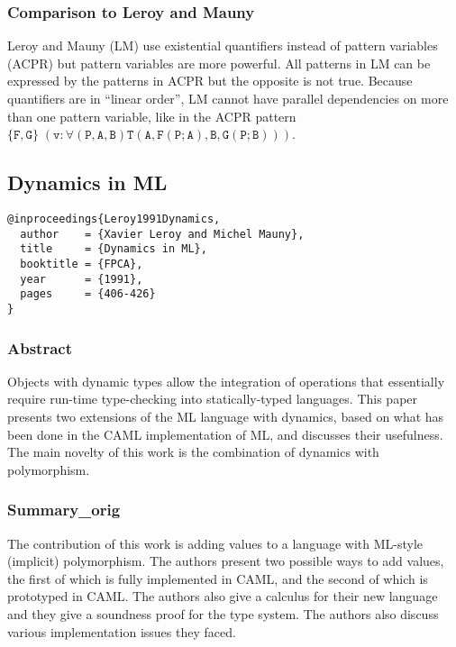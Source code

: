 \documentclass[12pt]{article}	%
\begin{document}
\subsubsection*{Comparison to Leroy and Mauny~\cite{Leroy1991Dynamics}}
Leroy and Mauny (LM) use existential quantifiers instead of pattern variables (ACPR) but pattern variables are more powerful. All patterns in LM can be expressed by the patterns in ACPR but the opposite is not true. Because quantifiers are in ``linear order'', LM cannot have parallel dependencies on more than one pattern variable, like in the ACPR pattern $\mathtt{\{F,G\} \; (v:\forall (P,A,B)T(A,F(P;A),B,G(P;B)))}$.




\subsection*{Dynamics in ML~\cite{Leroy1991Dynamics}}
\begin{verbatim}
@inproceedings{Leroy1991Dynamics,
  author    = {Xavier Leroy and Michel Mauny},
  title     = {Dynamics in ML},
  booktitle = {FPCA},
  year      = {1991},
  pages     = {406-426}
}
\end{verbatim}

\newcommand{\mlcode}[1]{$\mathtt{#1}$}

\subsubsection*{Abstract}
Objects with dynamic types allow the integration of operations that essentially require run-time type-checking into statically-typed languages. This paper presents two extensions of the ML language with dynamics, based on what has been done in the CAML implementation of ML, and discusses their usefulness. The main novelty of this work is the combination of dynamics with polymorphism.

\subsubsection*{Summary\_orig}
The contribution of this work is adding \Dynamic values to a language with ML-style (implicit) polymorphism. The authors present two possible ways to add \Dynamic values, the first of which is fully implemented in CAML, and the second of which is prototyped in CAML. The authors also give a calculus for their new language and they give a soundness proof for the type system. The authors also discuss various implementation issues they faced.
\end{document}
